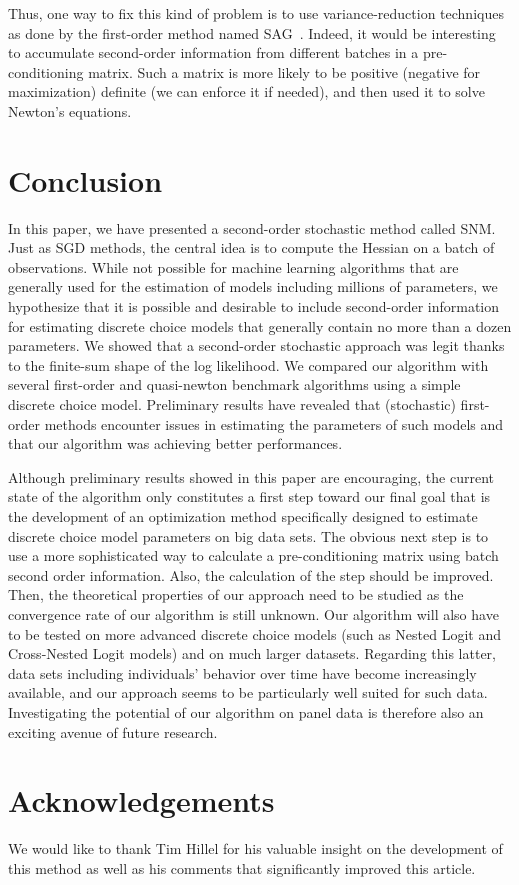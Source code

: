 \documentclass[conference]{IEEEtran}
\begin{document}
Thus, one way to fix this kind of problem is to use variance-reduction techniques as done by the first-order method named SAG~\cite{schmidt_minimizing_2013}. Indeed, it would be interesting to accumulate second-order information from different batches in a pre-conditioning matrix. Such a matrix is more likely to be positive (negative for maximization) definite (we can enforce it if needed), and then used it to solve Newton's equations. 

\section{Conclusion}
\label{sec:conclusion}

In this paper, we have presented a second-order stochastic method called SNM.  Just as SGD methods, the central idea is to compute the Hessian on a batch of observations. While not possible for machine learning algorithms that are generally used for the estimation of models including millions of parameters,  we hypothesize that it is possible and desirable to include second-order information for estimating discrete choice models that generally contain no more than a dozen parameters. We showed that a second-order stochastic approach was legit thanks to the finite-sum shape of the log likelihood. We compared our algorithm with several first-order and quasi-newton benchmark algorithms using a simple discrete choice model. Preliminary results have revealed that (stochastic) first-order methods encounter issues in estimating the parameters of such models and that our algorithm was achieving better performances.  

Although preliminary results showed in this paper are encouraging, the current state of the algorithm only constitutes a first step toward our final goal that is the development of an optimization method specifically designed to estimate discrete choice model parameters on big data sets. The obvious next step is to use a more sophisticated way to calculate a pre-conditioning matrix using batch second order information. Also, the calculation of the step should be improved. Then, the theoretical properties of our approach need to be studied as the convergence rate of our algorithm is still unknown. Our algorithm will also have to be tested on more advanced discrete choice models (such as Nested Logit and Cross-Nested Logit models) and on much larger datasets. Regarding this latter, data sets including individuals' behavior over time have become increasingly available, and our approach seems to be particularly well suited for such data. Investigating the potential of our algorithm on panel data is therefore also an exciting avenue of future research. 

\section{Acknowledgements} 
\label{sec:acknowledgements}

We would like to thank Tim Hillel for his valuable insight on the development of this method as well as his comments that significantly improved this article.


\end{document}
